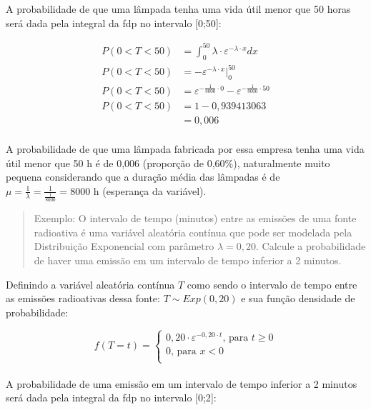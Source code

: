 \documentclass[
]{book}
\begin{document}
A probabilidade de que uma lâmpada tenha uma vida útil menor que 50 horas será dada pela integral da fdp no intervalo {[}0;50{]}:

\hfill\break

\begin{align*}
P( 0 < T < 50) & = \int_{0}^{50}  \lambda \cdot \varepsilon ^{- \lambda \cdot x} dx \\
P( 0 < T < 50) & = - \varepsilon^{-\lambda \cdot x} \rvert_{0}^{50} \\ 
P( 0 < T < 50) & = \varepsilon^{- \frac{1}{8000}  \cdot 0} - \varepsilon^{- \frac{1}{8000}   \cdot 50} \\
P( 0 < T < 50) & = 1-0,939413063 \\
               & = 0,006 \\
\end{align*}

\hfill\break

A probabilidade de que uma lâmpada fabricada por essa empresa tenha uma vida útil menor que 50 h é de 0,006 (proporção de 0,60\%), naturalmente muito pequena considerando que a duração média das lâmpadas é de \(\mu = \frac{1}{\lambda} =\frac{1}{\frac{1}{8000}}=8000\) h (esperança da variável).

\hfill\break

\begin{quote}
Exemplo: O intervalo de tempo (minutos) entre as emissões de uma fonte radioativa é uma variável aleatória contínua que pode ser modelada pela Distribuição Exponencial com parâmetro \(\lambda=0,20\). Calcule a probabilidade de haver uma emissão em um intervalo de tempo inferior a 2 minutos.
\end{quote}

\hfill\break

Definindo a variável aleatória contínua \(T\) como sendo o intervalo de tempo entre as emissões radioativas dessa fonte: \(T \sim Exp (0,20)\) e sua função densidade de probabilidade:

\hfill\break

\[
f(T=t)=
\begin{cases}
    0,20 \cdot \varepsilon ^{- 0,20\cdot t} \text{, para } t \ge 0 \\
    0 \text{, para } x < 0\\
\end{cases}
\]\\

A probabilidade de uma emissão em um intervalo de tempo inferior a 2 minutos será dada pela integral da fdp no intervalo {[}0;2{]}:
\end{document}
